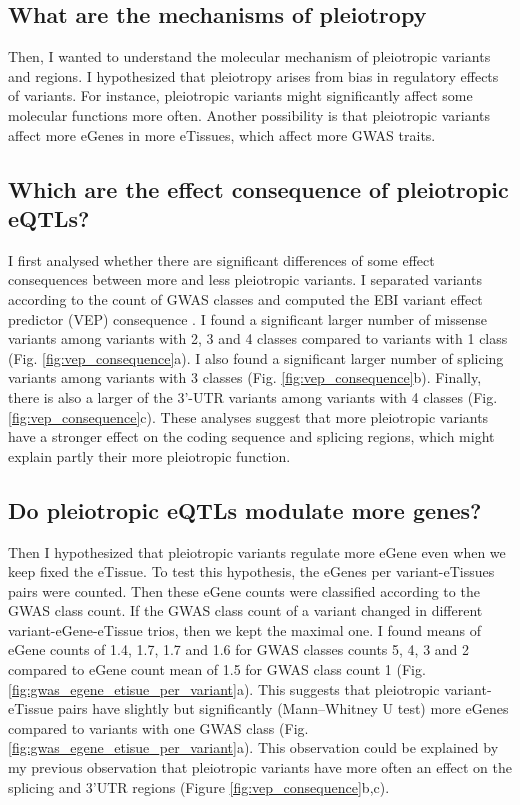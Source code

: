 \subsection*{What are the mechanisms of pleiotropy}

Then, I wanted to understand the molecular mechanism of pleiotropic variants and regions.
%
I hypothesized that pleiotropy arises from bias in regulatory effects of variants.
%
For instance, pleiotropic variants might significantly affect some molecular functions more often.
%
Another possibility is that pleiotropic variants affect more eGenes in more eTissues, which affect more GWAS traits.

\subsection*{Which are the effect consequence of pleiotropic eQTLs?}

I first analysed whether there are significant differences of some effect consequences between more and less pleiotropic variants.
%
I separated variants according to the count of GWAS classes and computed the EBI variant effect predictor (VEP) consequence \citep{2016.Cunningham.McLaren}.
%
I found a significant larger number of missense variants among variants with 2, 3 and 4 classes compared to variants with 1 class (Fig. \ref{fig:vep_consequence}a).
%
I also found a significant larger number of splicing variants among variants with 3 classes (Fig. \ref{fig:vep_consequence}b).
%
Finally, there is also a larger of the 3'-UTR variants among variants with 4 classes (Fig. \ref{fig:vep_consequence}c).
%
These analyses suggest that more pleiotropic variants have a stronger effect on the coding sequence and splicing regions, which might explain partly their more pleiotropic function.

\subsection*{Do pleiotropic eQTLs modulate more genes?}

Then I hypothesized that pleiotropic variants regulate more eGene even when we keep fixed the eTissue.
%
To test this hypothesis, the eGenes per variant-eTissues pairs were counted.
%
Then these eGene counts were classified according to the GWAS class count.
%
If the GWAS class count of a variant changed in different variant-eGene-eTissue trios, then we kept the maximal one.
%
I found means of eGene counts of 1.4, 1.7, 1.7 and 1.6 for GWAS classes counts 5, 4, 3 and 2 compared to eGene count mean of 1.5 for GWAS class count 1 (Fig. \ref{fig:gwas_egene_etisue_per_variant}a).
%
This suggests that pleiotropic variant-eTissue pairs have slightly but significantly (Mann–Whitney U test) more eGenes compared to variants with one GWAS class (Fig. \ref{fig:gwas_egene_etisue_per_variant}a).
%
This observation could be explained by my previous observation that pleiotropic variants have more often an effect on the splicing and 3'UTR regions (Figure \ref{fig:vep_consequence}b,c).

